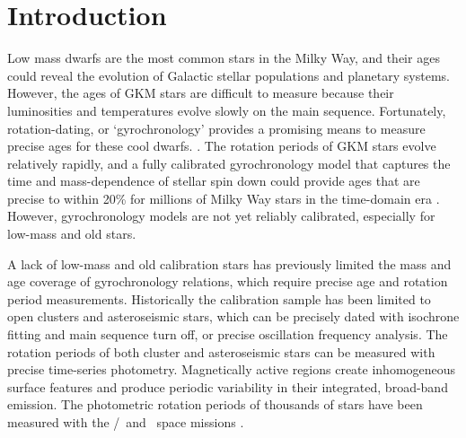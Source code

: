 \section{Introduction}

Low mass dwarfs are the most common stars in the Milky Way, and their ages
could reveal the evolution of Galactic stellar populations and planetary
systems.
However, the ages of GKM stars are difficult to measure because their
luminosities and temperatures evolve slowly on the main sequence.
Fortunately, rotation-dating, or `gyrochronology’ provides a promising means
to measure precise ages for these cool dwarfs.
\citep[\eg][]{schatzman1962, weber1967, kraft1967, skumanich1972, kawaler1988,
pinsonneault1989, barnes2003, barnes2007, mamajek2008, barnes2010, meibom2011,
meibom2015, vansaders2016}.
The rotation periods of GKM stars evolve relatively rapidly, and a fully
calibrated gyrochronology model that captures the time and mass-dependence of
stellar spin down could provide ages that are precise to within 20\% for
millions of Milky Way stars in the time-domain era \citep{epstein2014,
najita2016, angus2019}.
However, gyrochronology models are not yet reliably calibrated, especially for
low-mass and old stars.

A lack of low-mass and old calibration stars has previously limited the mass
and age coverage of gyrochronology relations, which require precise age and
rotation period measurements.
Historically the calibration sample has been limited to open clusters and
asteroseismic stars, which can be precisely dated with isochrone fitting and
main sequence turn off, or precise oscillation frequency analysis.
The rotation periods of both cluster and asteroseismic stars can be measured
with precise time-series photometry.
Magnetically active regions create inhomogeneous surface features and produce
periodic variability in their integrated, broad-band emission.
The photometric rotation periods of thousands of stars have been measured with
the \kepler/\ktwo\ and \tess\ space missions \citep{borucki2010, howell2014,
ricker2015}.

